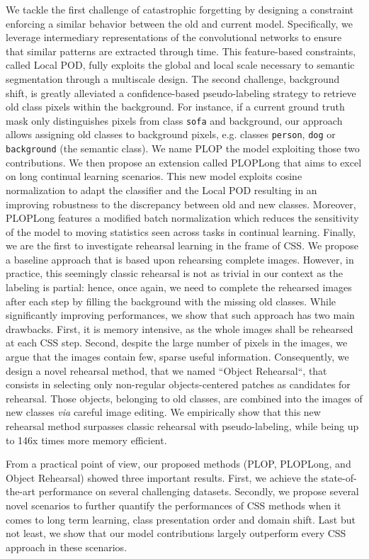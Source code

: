 We tackle the first challenge of catastrophic forgetting by designing a constraint enforcing a
similar behavior between the old and current model. Specifically, we leverage intermediary
representations of the convolutional networks to ensure that similar patterns are extracted through
time. This feature-based constraints, called Local POD, fully exploits the global and local scale
necessary to semantic segmentation through a multiscale design. The second challenge, background
shift, is greatly alleviated a confidence-based pseudo-labeling strategy to retrieve old class
pixels within the background. For instance, if a current ground truth mask only distinguishes pixels
from class \texttt{sofa} and background, our approach allows assigning old classes to background
pixels, e.g. classes \texttt{person}, \texttt{dog} or \texttt{background} (the semantic class). We
name PLOP the model exploiting those two contributions. We then propose an extension called PLOPLong
that aims to excel on long continual learning scenarios. This new model exploits cosine
normalization to adapt the classifier and the Local POD resulting in an improving robustness to the
discrepancy between old and new classes. Moreover, PLOPLong features a modified batch normalization
which reduces the sensitivity of the model to moving statistics seen across tasks in continual
learning. Finally, we are the first to investigate rehearsal learning in the frame of \ac{CSS}. We
propose a baseline approach that is based upon rehearsing complete images. However, in practice,
this seemingly classic rehearsal is not as trivial in our context as the labeling is partial: hence,
once again, we need to complete the rehearsed images after each step by filling the background with
the missing old classes. While significantly improving performances, we show that such approach has
two main drawbacks. First, it is memory intensive, as the whole images shall be rehearsed at each
\ac{CSS} step. Second, despite the large number of pixels in the images, we argue that the images contain
few, sparse useful information. Consequently, we design a novel rehearsal method, that we named
``Object Rehearsal``, that consists in selecting only non-regular objects-centered patches as
candidates for rehearsal. Those objects, belonging to old classes, are combined into the images of
new classes \textit{via} careful image editing. We empirically show that this new rehearsal method
surpasses classic rehearsal with pseudo-labeling, while being up to 146x times more memory
efficient.

From a practical point of view, our proposed methods (PLOP, PLOPLong, and Object Rehearsal) showed
three important results. First, we achieve the state-of-the-art performance on several challenging
datasets. Secondly, we propose several novel scenarios to further quantify the performances of \ac{CSS}
methods when it comes to long term learning, class presentation order and domain shift. Last but not
least, we show that our model contributions largely outperform every \ac{CSS} approach in these
scenarios.

